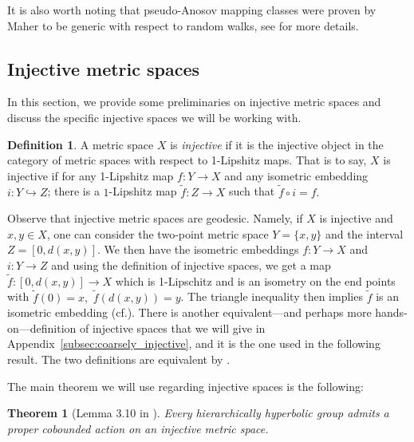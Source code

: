\documentclass{amsart}
\numberwithin{thm}{section}
\numberwithin{figure}{section}
\newtheorem{theorem}[thm]{Theorem}
\theoremstyle{definition}
\newtheorem{definition}[thm]{Definition}
\theoremstyle{definition}
\theoremstyle{remark}
\numberwithin{equation}{section}
\theoremstyle{plain}
\begin{document}
It is also worth noting that pseudo-Anosov mapping classes were proven by Maher to be generic with respect to random walks, see \cite{maher:random} for more details.






\subsection{Injective metric spaces}\label{subsec:construction_injective} 



In this section, we provide some preliminaries on injective metric spaces and discuss the specific injective spaces we will be working with.

\begin{definition} A metric space $X$ is \emph{injective} if it is the injective object in the category of metric spaces with respect to 1-Lipshitz maps. That is to say, $X$ is injective if for any 1-Lipshitz map $f:Y \rightarrow X$ and any isometric embedding $i:Y \hookrightarrow Z$; there is a $1$-Lipshitz map $\tilde{f}: Z \rightarrow X$ such that $\tilde{f}\circ i=f.$
\end{definition}

Observe that injective metric spaces are geodesic. Namely, if $X$ is injective and $x,y \in X$, one can consider the two-point metric space $Y=\{x,y\}$ and the interval $Z=[0, d(x,y)]$. We then have the isometric embeddings $f:Y \rightarrow X$ and $i: Y \rightarrow Z$ and using the definition of injective spaces, we get a map $\tilde{f} \colon [0, d(x,y)] \rightarrow X$ which is 1-Lipschitz and is an isometry on the end points with $\tilde{f}(0)=x,\, \, \tilde{f}(d(x,y))=y$. The triangle inequality then implies $\tilde{f}$ is an isometric embedding (cf.\cite[Page~6]{Lang13:Injective}).
There is another equivalent---and perhaps more hands-on---definition of injective spaces that we will give in Appendix~\ref{subsec:coarsely_injective}, and it is the one used in the following result. The two definitions are equivalent by \cite[Proposition~2.3]{Lang13:Injective}.

The main theorem we will use regarding injective spaces is the following:

\begin{theorem}[Lemma 3.10 in \cite{haettelhodapetyt:coarse}] Every hierarchically hyperbolic group admits a proper cobounded action on an injective metric space.
\end{theorem}
\end{document}
